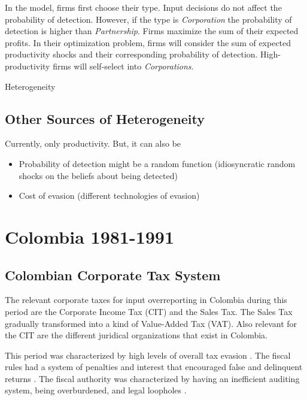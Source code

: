 \documentclass[
  12pt]{article}
\providecommand{\tightlist}{%
  \setlength{\itemsep}{0pt}\setlength{\parskip}{0pt}}\usepackage{longtable,booktabs,array}
\theoremstyle{definition}
\theoremstyle{remark}
\begin{document}
In the model, firms first choose their type. Input decisions do not
affect the probability of detection. However, if the type is
\emph{Corporation} the probability of detection is higher than
\emph{Partnership}. Firms maximize the sum of their expected profits. In
their optimization problem, firms will consider the sum of expected
productivity shocks and their corresponding probability of detection.
High-productivity firms will self-select into \emph{Corporations}.

\begin{anfxnote}{Heterogeneity}

\subsection{Other Sources of
Heterogeneity}\label{other-sources-of-heterogeneity}

Currently, only productivity. But, it can also be

\begin{itemize}
\tightlist
\item
  Probability of detection might be a random function (idiosyncratic
  random shocks on the beliefs about being detected)
\item
  Cost of evasion (different technologies of evasion)
\end{itemize}

\end{anfxnote}

\section{Colombia 1981-1991}\label{colombia-1981-1991}

\subsection{Colombian Corporate Tax
System}\label{colombian-corporate-tax-system}

The relevant corporate taxes for input overreporting in Colombia during
this period are the Corporate Income Tax (CIT) and the Sales Tax. The
Sales Tax gradually transformed into a kind of Value-Added Tax (VAT).
Also relevant for the CIT are the different juridical organizations that
exist in Colombia.

This period was characterized by high levels of overall tax evasion
\citep{Sanchez1994}. The fiscal rules had a system of penalties and
interest that encouraged false and delinquent returns
\citep{McLure1989}. The fiscal authority was characterized by having an
inefficient auditing system, being overburdened, and legal loopholes
\citep{Perry1990}.
\end{document}
